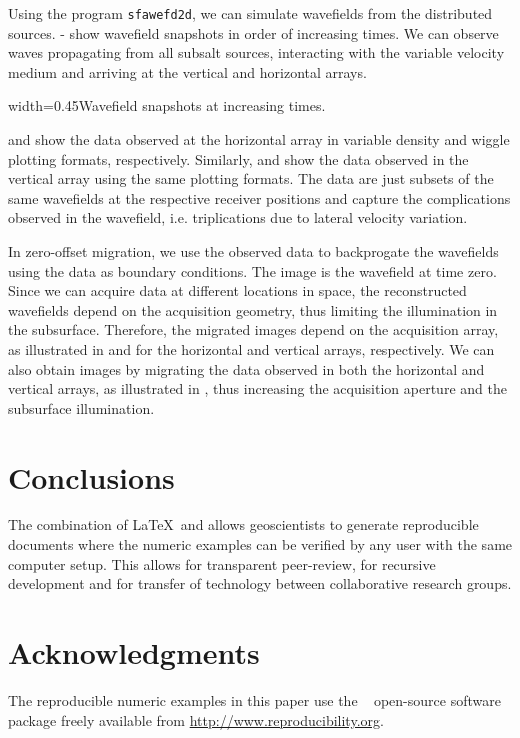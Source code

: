 
Using the \mg program \texttt{sfawefd2d}, we can simulate wavefields
from the distributed sources. - show
wavefield snapshots in order of increasing times. We can observe waves
propagating from all subsalt sources, interacting with the variable
velocity medium and arriving at the vertical and horizontal arrays.

{width=0.45\textwidth}{Wavefield snapshots at increasing times.}

 and  show the data observed at the horizontal
array in variable density and wiggle plotting formats,
respectively. Similarly,  and  show the data
observed in the vertical array using the same plotting formats. The
data are just subsets of the same wavefields at the respective
receiver positions and capture the complications observed in the
wavefield, i.e. triplications due to lateral velocity variation.



In zero-offset migration, we use the observed data to backprogate the
wavefields using the data as boundary conditions. The image is the
wavefield at time zero. Since we can acquire data at different
locations in space, the reconstructed wavefields depend on the
acquisition geometry, thus limiting the illumination in the
subsurface. Therefore, the migrated images depend on the acquisition
array, as illustrated in  and  for the horizontal
and vertical arrays, respectively. 
We can also obtain images by migrating the data observed in both the
horizontal and vertical arrays, as illustrated in , thus
increasing the acquisition aperture and the subsurface illumination.



\section{Conclusions}
The combination of \LaTeX\ and \mg allows geoscientists to generate
reproducible documents where the numeric examples can be verified by
any user with the same computer setup. This allows for transparent
peer-review, for recursive development and for transfer of technology
between collaborative research groups.

\section{Acknowledgments}
The reproducible numeric examples in this paper use the \mg~
open-source software package freely available from
\url{http://www.reproducibility.org}.



